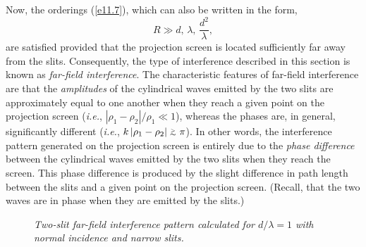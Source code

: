 Now, the orderings (\ref{e11.7}), which can also be written in the form,
\begin{equation}\label{e11.9}
R\gg d,\,\lambda,\,\frac{d^2}{\lambda},
\end{equation}
are satisfied provided that the projection screen is located sufficiently far away from the slits. Consequently, the
type of interference described in this section is known as {\em far-field interference}.  The characteristic
features of far-field
interference are that the {\em amplitudes}\/ of the cylindrical waves emitted by the two slits are approximately equal to one another  when they reach  a given point on the projection
screen ({\em i.e.}, $|\rho_1-\rho_2|/\rho_1\ll 1$), whereas the phases are, in general, significantly different ({\em i.e.}, $k\,|\rho_1-\rho_2|\stackrel {_{\normalsize>}}{_{\normalsize \sim}} \pi$). In other words, the
interference pattern generated on the projection screen is  entirely due to the {\em phase difference}\/ between the
 cylindrical waves emitted by the two slits when they reach the screen. This phase difference is produced by the slight difference in path length between  the slits and a
given point on the projection screen. (Recall, that the two waves are in phase when they are emitted by the slits.)

\begin{figure}
\epsfysize=2.5in
\centerline{}
\caption{\em Two-slit far-field interference pattern calculated for $d/\lambda = 1$ with normal incidence and narrow slits.}\label{f11.3}   
\end{figure}

